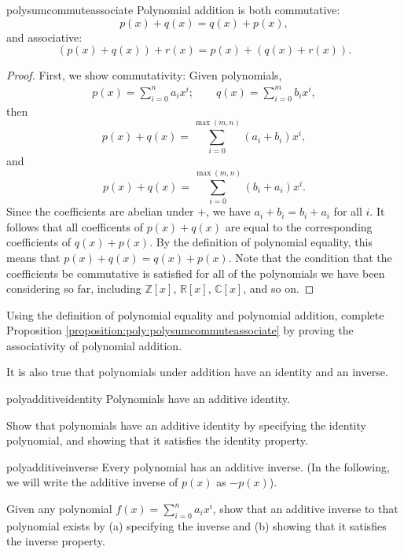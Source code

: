 \begin {prop}{polysumcommuteassociate} Polynomial addition is both commutative: 
	\[p(x)+q(x) = q(x) + p(x),\]	
and associative:	
	\[(p(x) + q(x)) + r(x)  = p(x) + (q(x) + r(x)).\]	
\end {prop}
\begin {proof}{}
First, we show commutativity:	
Given polynomials,
\begin{align*}
p(x)  = \sum^{n}_{i=0} a_i x^i; \qquad
q(x)  = \sum^{m}_{i=0} b_i x^i,
\end{align*}	
then 
\[
p(x) + q(x) =  \sum_{i=0}^{\max(m,n)} (a_i + b_i) x^i,
\]
and
\[
p(x) + q(x) =  \sum_{i=0}^{\max(m,n)} (b_i + a_i) x^i.
\]
Since the coefficients are abelian under +, we have $a_i + b_i = b_i + a_i$ for all $i$. It follows that all coefficents of $p(x) + q(x)$ are equal to the corresponding coefficients of $q(x) + p(x)$. By the definition of polynomial equality, this means that 
$p(x) + q(x) = q(x) + p(x)$.  Note that the condition that the coefficients be commutative is satisfied for all of the polynomials we have been considering so far, including $\mathbb{Z}[x]$, $\mathbb{R}[x]$, $\mathbb{C}[x]$, and so on.

\end {proof}

\begin {exercise}{}
Using the definition of polynomial equality and polynomial addition, complete Proposition \ref{proposition:poly:polysumcommuteassociate} by proving the associativity of polynomial addition.
\end {exercise}

It is also true that polynomials under addition have an identity and an inverse.

\begin {prop}{polyadditiveidentity} Polynomials have an additive identity.
\end{prop}
\begin{exercise}{}
Show that polynomials have an additive identity by specifying the identity polynomial, and showing that it satisfies the identity property.
\end{exercise}

\begin{prop}{polyadditiveinverse} Every polynomial has an additive inverse.  (In the following, we will write the additive inverse of $p(x)$ as $-p(x)$).
\end{prop}
\begin{exercise}{}
Given any polynomial $f(x) = \sum_{i=0}^{n} a_i x^i$, show that an additive inverse to that polynomial exists by (a) specifying the inverse and (b) showing that it satisfies the inverse property.
\end{exercise}

